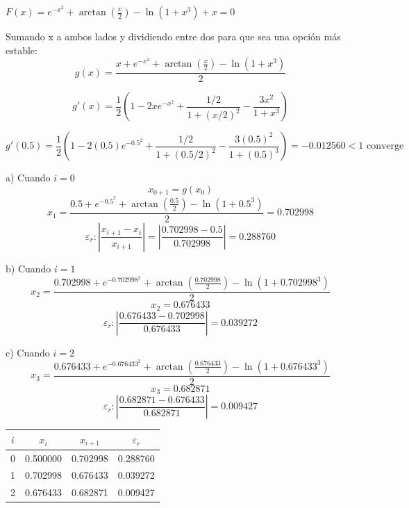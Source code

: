 \documentclass[12pt]{article}
\begin{document}
\begin{center}
$F(x) = e^{-x^2} + \arctan\left(\frac{x}{2}\right) - \ln(1+x^3) + x = 0$

Sumando x a ambos lados y dividiendo entre dos para que sea una opción más estable:
\[g(x) = \frac{x + e^{-x^2} + \arctan\left(\frac{x}{2}\right) - \ln(1+x^3)}{2}\]

\[g'(x) = \frac{1}{2}\left(1-2xe^{-x^2}+ \frac{1/2}{1+(x/2)^2} - \frac{3x^2}{1+x^3}\right)\]

\[g'(0.5) = \frac{1}{2}\left(1-2(0.5)e^{-0.5^2}+ \frac{1/2}{1+(0.5/2)^2} - \frac{3(0.5)^2}{1+(0.5)^3}\right) = -0.012560 < 1 \text{ converge}\]

\vspace{0.5cm}

a) Cuando $i = 0$
\[x_{0+1} = g(x_0)\]
\[x_1 = \frac{0.5 + e^{-0.5^2} + \arctan\left(\frac{0.5}{2}\right) - \ln(1+0.5^3)}{2} = 0.702998\]
\[\varepsilon_r: \left|\frac{x_{i+1}-x_i}{x_{i+1}}\right| = \left|\frac{0.702998-0.5}{0.702998}\right| = 0.288760\]

\vspace{0.5cm}

b) Cuando $i = 1$
\[x_2 = \frac{0.702998 + e^{-0.702998^2} + \arctan\left(\frac{0.702998}{2}\right) - \ln(1+0.702998^3)}{2}\]
\[x_2 = 0.676433\]
\[\varepsilon_r: \left|\frac{0.676433-0.702998}{0.676433}\right| = 0.039272\]

\vspace{0.5cm}

c) Cuando $i = 2$
\[x_3 = \frac{0.676433 + e^{-0.676433^2} + \arctan\left(\frac{0.676433}{2}\right) - \ln(1+0.676433^3)}{2}\]
\[x_3 = 0.682871\]
\[\varepsilon_r: \left|\frac{0.682871-0.676433}{0.682871}\right| = 0.009427\]

\vspace{1cm}

\begin{center}
	\begin{tabular}{|c|c|c|c|}
		\hline
		$i$ & $x_i$ & $x_{i+1}$ & $\varepsilon_r$ \\ \hline
		0 & 0.500000 & 0.702998 & 0.288760 \\ \hline
		1 & 0.702998 & 0.676433 & 0.039272 \\ \hline
		2 & 0.676433 & 0.682871 & 0.009427 \\ \hline
	\end{tabular}
\end{center}

\vspace{1cm}


\end{center}
\end{document}
